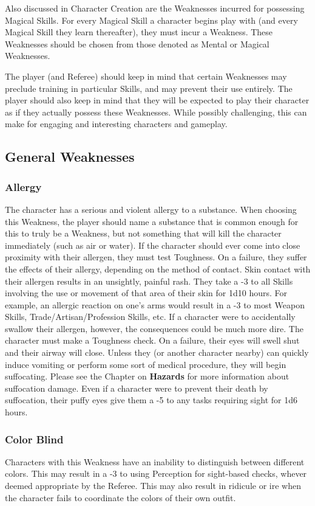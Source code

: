\documentclass[oneside]{book}
\begin{document}
Also discussed in Character Creation are the Weaknesses incurred for possessing Magical Skills. For every Magical Skill a character begins play with (and every Magical Skill they learn thereafter), they must incur a Weakness. These Weaknesses should be chosen from those denoted as Mental or Magical Weaknesses.

The player (and Referee) should keep in mind that certain Weaknesses may preclude training in particular Skills, and may prevent their use entirely. The player should also keep in mind that they will be expected to play their character as if they actually possess these Weaknesses. While possibly challenging, this can make for engaging and interesting characters and gameplay.  
\newpage
\begin{multicols}{2}
\section{General Weaknesses}
\subsubsection{Allergy}
The character has a serious and violent allergy to a substance. When choosing this Weakness, the player should name a substance that is common enough for this to truly be a Weakness, but not something that will kill the character immediately (such as air or water). If the character should ever come into close proximity with their allergen, they must test Toughness. On a failure, they suffer the effects of their allergy, depending on the method of contact. Skin contact with their allergen results in an unsightly, painful rash. They take a -3 to all Skills involving the use or movement of that area of their skin for 1d10 hours. For example, an allergic reaction on one's arms would result in a -3 to most Weapon Skills, Trade/Artisan/Profession Skills, etc. If a character were to accidentally swallow their allergen, however, the consequences could be much more dire. The character must make a Toughness check. On a failure, their eyes will swell shut and their airway will close. Unless they (or another character nearby) can quickly induce vomiting or perform some sort of medical procedure, they will begin suffocating. Please see the Chapter on \textbf{Hazards} for more information about suffocation damage. Even if a character were to prevent their death by suffocation, their puffy eyes give them a -5 to any tasks requiring sight for 1d6 hours.
\subsubsection{Color Blind}
Characters with this Weakness have an inability to distinguish between different colors. This may result in a -3 to using Perception for sight-based checks, whever deemed appropriate by the Referee. This may also result in ridicule or ire when the character fails to coordinate the colors of their own outfit. 

\end{multicols}
\end{document}
